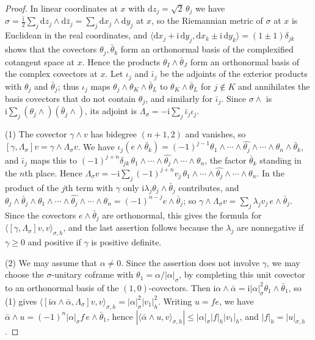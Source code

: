 \begin{proof}
In linear coordinates at $x$ with $\mathrm dz_j=\sqrt2\,\theta_j$ we have $\sigma=\frac{\mathrm i}{2}\sum_j\mathrm dz_j\wedge\mathrm d\bar z_j=\sum_j\mathrm dx_j\wedge\mathrm dy_j$ at $x$, so the Riemannian metric of $\sigma$ at $x$ is Euclidean in the real coordinates, and $\langle\mathrm dx_j+\mathrm i\,\mathrm dy_j,\mathrm dx_k\pm\mathrm i\,\mathrm dy_k\rangle=(1\pm1)\delta_{jk}$ shows that the covectors $\theta_j,\bar\theta_k$ form an orthonormal basis of the complexified cotangent space at $x$. Hence the products $\theta_I\wedge\bar\theta_J$ form an orthonormal basis of the complex covectors at $x$. Let $\iota_j$ and $\bar\iota_j$ be the adjoints of the exterior products with $\theta_j$ and $\bar\theta_j$; thus $\iota_j$ maps $\theta_j\wedge\theta_K\wedge\bar\theta_L$ to $\theta_K\wedge\bar\theta_L$ for $j\notin K$ and annihilates the basis covectors that do not contain $\theta_j$, and similarly for $\bar\iota_j$. Since $\sigma\wedge{}$ is $\mathrm i\sum_j(\theta_j\wedge)(\bar\theta_j\wedge)$, its adjoint is $\Lambda_\sigma=-\mathrm i\sum_j\bar\iota_j\iota_j$.

(1) The covector $\gamma\wedge v$ has bidegree $(n+1,2)$ and vanishes, so $[\gamma,\Lambda_\sigma]v=\gamma\wedge\Lambda_\sigma v$. We have $\iota_j(e\wedge\bar\theta_k)=(-1)^{j-1}\theta_1\wedge\cdots\wedge\widehat{\theta_j}\wedge\cdots\wedge\theta_n\wedge\bar\theta_k$, and $\bar\iota_j$ maps this to $(-1)^{j+n}\delta_{jk}\,\theta_1\wedge\cdots\wedge\widehat{\theta_j}\wedge\cdots\wedge\theta_n$, the factor $\bar\theta_k$ standing in the $n$th place. Hence $\Lambda_\sigma v=-\mathrm i\sum_j(-1)^{j+n}v_j\,\theta_1\wedge\cdots\wedge\widehat{\theta_j}\wedge\cdots\wedge\theta_n$. In the product of the $j$th term with $\gamma$ only $\mathrm i\lambda_j\theta_j\wedge\bar\theta_j$ contributes, and $\theta_j\wedge\bar\theta_j\wedge\theta_1\wedge\cdots\wedge\widehat{\theta_j}\wedge\cdots\wedge\theta_n=(-1)^{n-j}e\wedge\bar\theta_j$; so $\gamma\wedge\Lambda_\sigma v=\sum_j\lambda_jv_j\,e\wedge\bar\theta_j$. Since the covectors $e\wedge\bar\theta_j$ are orthonormal, this gives the formula for $\langle[\gamma,\Lambda_\sigma]v,v\rangle_{\sigma,h}$, and the last assertion follows because the $\lambda_j$ are nonnegative if $\gamma\geq0$ and positive if $\gamma$ is positive definite.

(2) We may assume that $\alpha\neq0$. Since the assertion does not involve $\gamma$, we may choose the $\sigma$-unitary coframe with $\theta_1=\alpha/|\alpha|_\sigma$, by completing this unit covector to an orthonormal basis of the $(1,0)$-covectors. Then $\mathrm i\alpha\wedge\bar\alpha=\mathrm i|\alpha|_\sigma^2\theta_1\wedge\bar\theta_1$, so (1) gives $\langle[\mathrm i\alpha\wedge\bar\alpha,\Lambda_\sigma]v,v\rangle_{\sigma,h}=|\alpha|_\sigma^2|v_1|_h^2$. Writing $u=fe$, we have $\bar\alpha\wedge u=(-1)^n|\alpha|_\sigma f\,e\wedge\bar\theta_1$, hence $|\langle\bar\alpha\wedge u,v\rangle_{\sigma,h}|\leq|\alpha|_\sigma|f|_h|v_1|_h$, and $|f|_h=|u|_{\sigma,h}$.


\end{proof}
